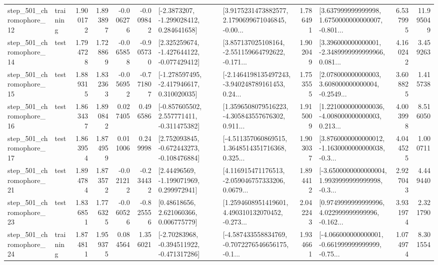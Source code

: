 \begin{tabular}{llrrrrllrlrr}
  step\_501\_chromophore\_12 &  training &      1.900172 &    1.893897 &     -0.006276 & -0.009842 &     [-2.3873207, -1.299028412, 0.284641658] &  [3.9175231473882577, 2.1790699671046845, -0.00... &       1.786491 &  [3.637999999999998, 1.6750000000000007, -0.801... &            6.537995 &         11.995049 \\
  step\_501\_chromophore\_14 &      test &      1.794728 &    1.728869 &     -0.065858 & -0.905730 &   [2.325259674, -1.427644122, -0.077429412] &  [3.857137025108164, -2.551159664792622, -0.171... &       1.902049 &  [3.396000000000001, -2.3489999999999966, 0.081... &            4.160242 &          3.459263 \\
  step\_501\_chromophore\_15 &      test &      1.889315 &    1.832363 &     -0.056952 & -0.771807 &   [-1.278597495, -2.417946617, 0.310020035] &  [-2.1464198135497243, -3.940248789161453, 0.24... &       1.753555 &  [2.078000000000003, 3.608000000000004, -0.2549... &            3.608825 &          1.415738 \\
  step\_501\_chromophore\_16 &      test &      1.863437 &    1.890842 &      0.027405 &  0.496586 &   [-0.857605502, 2.557771411, -0.311475382] &  [1.3596508079516223, -4.305843557676302, 0.911... &       1.915009 &  [1.2210000000000036, -4.008000000000003, 0.213... &            4.003998 &          8.516050 \\
  step\_501\_chromophore\_17 &      test &      1.863954 &    1.874959 &      0.011006 &  0.249998 &   [2.752093845, -0.672443273, -0.108476884] &  [-4.511357060869515, 1.3648514351716368, 0.325... &       1.903037 &  [3.8760000000000012, -1.1630000000000038, -0.3... &            4.044525 &          1.000711 \\
  step\_501\_chromophore\_21 &      test &      1.894784 &    1.873572 &     -0.021212 & -0.234432 &     [2.44496569, -1.199071969, 0.299972941] &  [4.116915471176513, -2.059046757333206, 0.0679... &       1.894412 &  [-3.6500000000000004, 1.9939999999999998, -0.3... &            2.927043 &          4.449440 \\
  step\_501\_chromophore\_23 &      test &      1.836851 &    1.776325 &     -0.060526 & -0.825556 &      [0.48618656, 2.621060366, 0.006775779] &  [1.2594608951419601, 4.490310132070452, -0.273... &       2.042243 &  [0.9749999999999996, 4.022999999999996, -0.162... &            3.931974 &          2.321790 \\
  step\_501\_chromophore\_24 &  training &      1.874811 &    1.959375 &      0.084564 &  1.356021 &   [-2.70283968, -0.394511922, -0.471317286] &  [-4.587433558834769, -0.7072276546656175, -0.1... &       1.934661 &  [-4.066000000000001, -0.661999999999999, -0.75... &            1.074974 &          8.301554 \\

\end{tabular}
